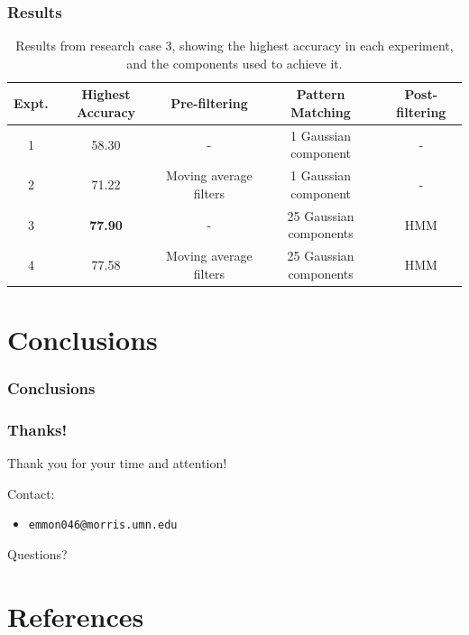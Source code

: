 \documentclass{beamer}
\newcommand{\linespace}{\vskip 0.25cm}
\begin{document}
\begin{frame}
	\frametitle{Results}
	
\begin{table}\tiny
\centering
\begin{tabular}{|c|c|c|c|c|} \hline
\textbf{Expt.} & \textbf{Highest Accuracy} & \textbf{Pre-filtering} & \textbf{Pattern Matching} & \textbf{Post-filtering} \\ \hline
1 & 58.30 & - & 1 Gaussian component & - \\ \hline
2 & 71.22 & Moving average filters & 1 Gaussian component & - \\ \hline
3 & \textbf{77.90} & - & 25 Gaussian components & HMM \\ \hline
4 & 77.58 & Moving average filters & 25 Gaussian components & HMM \\ \hline

\end{tabular}
\caption{Results from research case 3, showing the highest accuracy in each experiment, and the components used to achieve it.}
\label{tab:tab9}
\end{table}

\end{frame}  


\section[Conclusions]{Conclusions}

\begin{frame}
\frametitle{Conclusions}

\end{frame}

\begin{frame}
	\frametitle{Thanks!}
	
	Thank you for your time and attention!
		
	\linespace
	\linespace
	
	Contact:  
	\begin{itemize}
		\item \texttt{emmon046@morris.umn.edu}
	\end{itemize}
	
	\linespace
	\linespace
	
	\begin{center}
	{\huge Questions?}
	\end{center}
\end{frame}

\section*{References}
\end{document}
